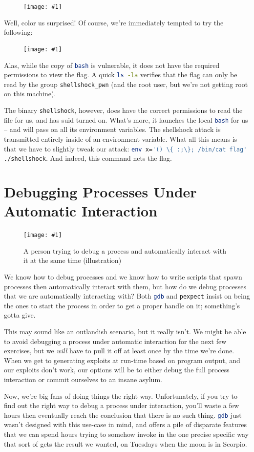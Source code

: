 \documentclass{article}
\newcommand{\displayimage}[1] {
\begin{figure}[H]
    \centering
    \texttt{[image: \#1]} 
\end{figure}
}
\newcommand{\wrapimagerightcap}[2] {
    \begin{figure}\begin{center}\texttt{[image: \#1]}\end{center}\caption{#2}\end{figure}}
\newcommand{\xcode}[2]{\colorbox{ubuntuback}{\lstinline[language=#1]|#2|}}
\begin{document}
\displayimage{./exercises/09_shellshock/vulnerable.png}

Well, color us surprised! Of course, we're immediately tempted to try the following:

\displayimage{./exercises/09_shellshock/permission_denied.png}

Alas, while the copy of \xcode{bash}{bash} is vulnerable, it does not have the required permissions to view the flag. A quick \xcode{bash}{ls -la} verifies that the flag can only be read by the group \xcode{bash}{shellshock_pwn} (and the root user, but we're not getting root on this machine).

The binary \xcode{bash}{shellshock}, however, does have the correct permissions to read the file for us, and has suid turned on. What's more, it launches the local \xcode{bash}{bash} for us -- and will pass on all its environment variables. The shellshock attack is transmitted entirely inside of an environment variable. What all this means is that we have to slightly tweak our attack: \xcode{bash}{env x='() \{ :;\}; /bin/cat flag' ./shellshock}. And indeed, this command nets the flag. 

\section{Debugging Processes Under Automatic Interaction}

\wrapimagerightcap{./images/debugging_interaction.png}{A person trying to debug a process and automatically interact with it at the same time (illustration)}
We know how to debug processes and we know how to write scripts that spawn processes then automatically interact with them, but how do we debug processes that we are automatically interacting with? Both \xcode{bash}{gdb} and \xcode{python}{pexpect} insist on being the ones to start the process in order to get a proper handle on it; something's gotta give.

This may sound like an outlandish scenario, but it really isn't. We might be able to avoid debugging a process under automatic interaction for the next few exercises, but we \textit{will} have to pull it off at least once by the time we're done. When we get to generating exploits at run-time based on program output, and our exploits don't work, our options will be to either debug the full process interaction or commit ourselves to an insane asylum.

Now, we're big fans of doing things the right way. Unfortunately, if you try to find out the right way to debug a process under interaction, you'll waste a few hours then eventually reach the conclusion that there is no such thing. \xcode{bash}{gdb} just wasn't designed with this use-case in mind, and offers a pile of disparate features that we can spend hours trying to somehow invoke in the one precise specific way that sort of gets the result we wanted, on Tuesdays when the moon is in Scorpio. 
\end{document}
